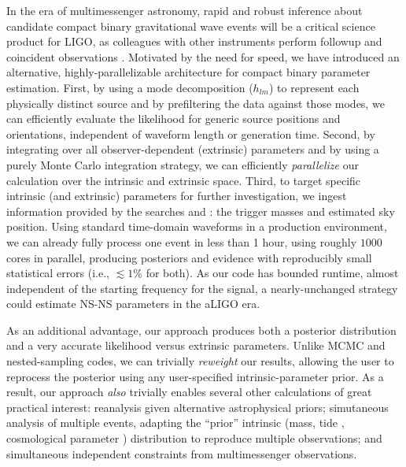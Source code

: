 \label{sec:Conclude}

In the era of multimessenger astronomy, rapid and robust inference about candidate compact binary gravitational wave
events will be a critical science product for LIGO, as  colleagues with other instruments  perform followup and
coincident observations \cite{LIGO-2013-WhitePaper-CoordinatedEMObserving}.  
Motivated by the need for speed, we have introduced an alternative, highly-parallelizable architecture for compact
binary parameter estimation.   
%   
First, by using a mode decomposition  ($h_{lm}$) to represent each physically distinct source and by
prefiltering the data against those modes, we can efficiently evaluate the likelihood for generic source positions and
orientations, independent of waveform length or generation time.   
% 
Second, by integrating over all observer-dependent (extrinsic) parameters and by using a purely Monte Carlo
integration strategy, we can efficiently \emph{parallelize} our calculation over the intrinsic and extrinsic space.  
%
Third, to target specific intrinsic (and extrinsic) parameters for further investigation, we ingest information provided
by the searches and \BS{}: the trigger masses and estimated sky position.  
Using standard time-domain waveforms in a production environment, we can already fully process one event in less than 1 hour, using roughly $1000$ cores in parallel,
producing posteriors and evidence with reproducibly small statistical errors (i.e., $\lesssim 1\%$ for both).  
%
As our code has bounded runtime, almost independent of the starting frequency for the signal, a nearly-unchanged strategy could
 estimate NS-NS parameters in the aLIGO era.  

As an additional advantage,  our approach  produces both a posterior distribution and  a very accurate likelihood versus extrinsic parameters.  Unlike MCMC and nested-sampling codes, we can trivially \emph{reweight} our results, allowing the user to
reprocess the posterior using any user-specified intrinsic-parameter prior.  
%
As a result, our approach \emph{also} trivially enables several other calculations of great practical interest:
reanalysis given alternative astrophysical priors;  simutaneous analysis of multiple events, adapting the ``prior''
intrinsic (mass, tide \cite{2014arXiv1402.5156W,2013PhRvD..88d4042R}, cosmological parameter \cite{2010ApJ...725..496N,2012PhRvD..85b3535T,2012PhRvL.108i1101M}) distribution to reproduce multiple observations; and simultaneous independent constraints from
multimessenger observations. 

